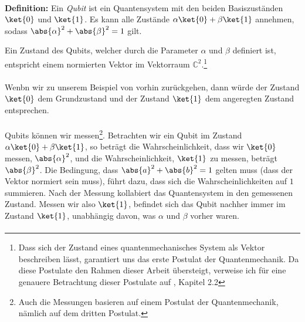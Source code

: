 \paragraph{}
\textbf{Definition:} Ein \textit{Qubit} ist ein Quantensystem mit den beiden Basiszuständen $\ket{0}$ und $\ket{1}$. Es kann alle Zustände $\alpha\ket{0} + \beta\ket{1}$ annehmen, sodass $\abs{\alpha}^2 + \abs{\beta}^2 = 1$ gilt.

Ein Zustand des Qubits, welcher durch die Parameter $\alpha$ und $\beta$ definiert ist, entspricht einem normierten Vektor im Vektorraum $\mathbb{C}^2$.\footnote{Dass sich der Zustand eines quantenmechanisches System als Vektor beschreiben lässt, garantiert uns das erste Postulat der Quantenmechanik. Da diese Postulate den Rahmen dieser Arbeit übersteigt, verweise ich für eine genauere Betrachtung dieser Postulate auf \cite{QC}, Kapitel 2.2}

\paragraph{}
Wenbn wir zu unserem Beispiel von vorhin zurückgehen, dann würde der Zustand $\ket{0}$ dem Grundzustand und der Zustand $\ket{1}$ dem angeregten Zustand entsprechen.
\paragraph{}

Qubits können wir messen\footnote{Auch die Messungen basieren auf einem Postulat der Quantenmechanik, nämlich auf dem dritten Postulat.}. Betrachten wir ein Qubit im Zustand $\alpha\ket{0} + \beta\ket{1}$, so beträgt die Wahrscheinlichkeit, dass wir $\ket{0}$ messen, $\abs{\alpha}^2$, und die Wahrscheinlichkeit, $\ket{1}$ zu messen, beträgt $\abs{\beta}^2$. Die Bedingung, dass $\abs{a}^2 + \abs{b}^2 = 1$ gelten muss (dass der Vektor normiert sein muss), führt dazu, dass sich die Wahrscheinlichkeiten auf $1$ summieren. Nach der Messung kollabiert das Quantensystem in den gemessenen Zustand. Messen wir also $\ket{1}$, befindet sich das Qubit nachher immer im Zustand $\ket{1}$, unabhängig davon, was $\alpha$ und $\beta$ vorher waren.

\paragraph{}

